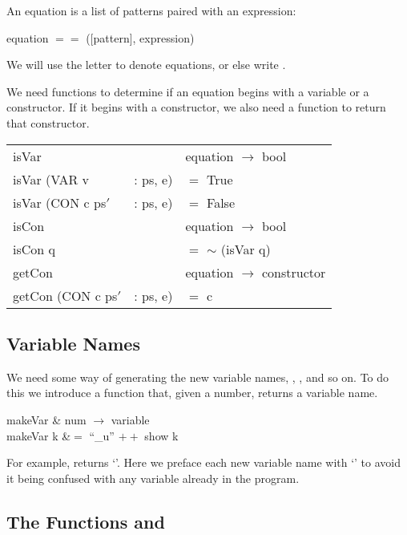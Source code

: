 An equation is a list of patterns paired with an expression:
\begin{mlcoded}
    equation $==$ ([pattern], expression)
\end{mlcoded}
We will use the letter  to denote equations, or else write .

We need functions to determine if an equation begins with a variable or a constructor. If it begins with a constructor, we also need a function to return that constructor.
\begin{mlcoded}
\setlength{\tabcolsep}{0.25em}
\begin{tabular}{lll}
        isVar &&\hastype{} equation $\rightarrow$ bool \\
    isVar (VAR v &: ps, e) &$=$ True \\
    isVar (CON c ps$'$ &: ps, e) &$=$ False\\

    isCon &&\hastype{} equation $\rightarrow$ bool \\
    isCon q &&$=$ $\sim$ (isVar q)\\

    getCon &&\hastype{} equation $\rightarrow$ constructor \\
    getCon (CON c ps$'$ &: ps, e) &$=$ c\\
\end{tabular}
\end{mlcoded}

\subsection{Variable Names}

We need some way of generating the new variable names, , , and so on. To do this we introduce a function  that, given a number, returns a variable name.
\begin{letalign}
    makeVar &\hastype{} num $\rightarrow$ variable \\
    makeVar k &$=$ ``\_u'' $++$ show k
\end{letalign}
For example,  returns `'. Here we preface each new variable name with `\ml{\_}' to avoid it being confused with any variable already in the program.

\subsection{The Functions  and }

